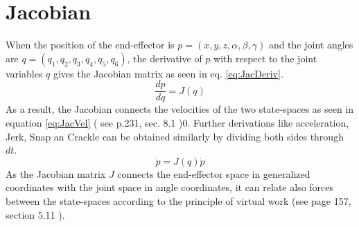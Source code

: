 \section{Jacobian} \label{sec:Jacobian}%
When the position of the end-effector is $p=(x,y,z,\alpha,\beta,\gamma)$ and the joint angles are  $q=(q_1, q_2, q_3, q_4, q_5, q_6)$, the derivative of $p$ with respect to the joint variables $q$ gives the Jacobian matrix as seen in eq. \ref{eq:JacDeriv}.\\
\begin{equation} \label{eq:JacDeriv}
	\frac{dp}{dq}=J(q)
\end{equation}
\medskip
As a result, the Jacobian connects the velocities of the two state-spaces as seen in equation \ref{eq:JacVel} ( see p.231, sec. 8.1 \cite{CorkeRoboticVisionControl})0. Further derivations like acceleration, Jerk, Snap an Crackle can be obtained similarly by dividing both sides through $dt$. \\
\begin{equation}\label{eq:JacVel}
	\dot{p}=J(q)\dot{p}
\end{equation}
As the Jacobian matrix $J$ connects the end-effector space in generalized coordinates with the joint space in angle coordinates, it can relate also forces between the state-spaces according to the principle of virtual work (see page 157, section 5.11 \cite{IndustrialRobotArm}).